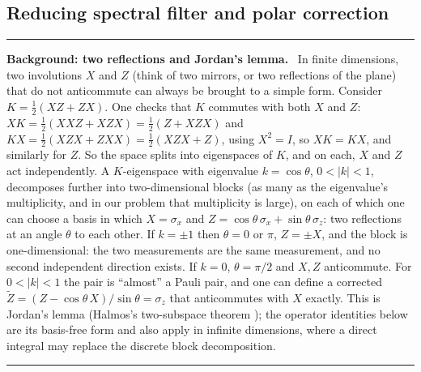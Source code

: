 \documentclass[11pt,a4paper]{article}
\newcommand{\Zt}{\widetilde Z}
\newenvironment{background}[1]{\par\medskip\noindent\hrule\smallskip\noindent\textbf{Background: #1.}\ \ignorespaces}{\par\smallskip\noindent\hrule\medskip}
\begin{document}
\subsection{Reducing spectral filter and polar correction}

\begin{background}{two reflections and Jordan's lemma}
In finite dimensions, two involutions $X$ and $Z$ (think of two mirrors, or two reflections of the plane) that do not anticommute can always be brought to a simple form. Consider $K=\frac12(XZ+ZX)$. One checks that $K$ commutes with both $X$ and $Z$: $XK=\frac12(XXZ+XZX)=\frac12(Z+XZX)$ and $KX=\frac12(XZX+ZXX)=\frac12(XZX+Z)$, using $X^2=I$, so $XK=KX$, and similarly for $Z$. So the space splits into eigenspaces of $K$, and on each, $X$ and $Z$ act independently. A $K$-eigenspace with eigenvalue $k=\cos\theta$, $0<|k|<1$, decomposes further into two-dimensional blocks (as many as the eigenvalue's multiplicity, and in our problem that multiplicity is large), on each of which one can choose a basis in which $X=\sigma_x$ and $Z=\cos\theta\,\sigma_x+\sin\theta\,\sigma_z$: two reflections at an angle $\theta$ to each other. If $k=\pm1$ then $\theta=0$ or $\pi$, $Z=\pm X$, and the block is one-dimensional: the two measurements are the same measurement, and no second independent direction exists. If $k=0$, $\theta=\pi/2$ and $X,Z$ anticommute. For $0<|k|<1$ the pair is ``almost'' a Pauli pair, and one can define a corrected $\Zt=(Z-\cos\theta\,X)/\sin\theta=\sigma_z$ that anticommutes with $X$ exactly. This is Jordan's lemma (Halmos's two-subspace theorem \cite{Halmos1969}); the operator identities below are its basis-free form and also apply in infinite dimensions, where a direct integral may replace the discrete block decomposition.
\end{background}
\end{document}
